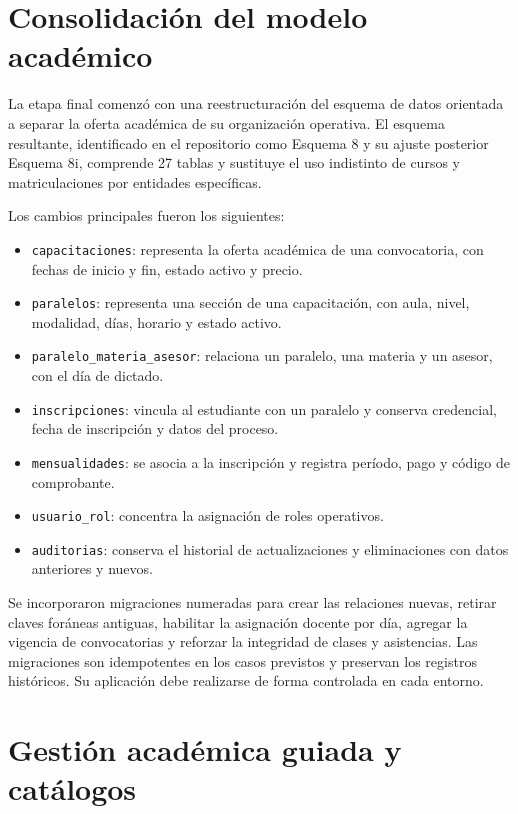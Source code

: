 \documentclass[12pt,a4paper,oneside]{report}
\begin{document}
\section{Consolidación del modelo académico}

La etapa final comenzó con una reestructuración del esquema de datos orientada a separar la oferta académica de su organización operativa. El esquema resultante, identificado en el repositorio como Esquema 8 y su ajuste posterior Esquema 8i, comprende 27 tablas y sustituye el uso indistinto de cursos y matriculaciones por entidades específicas.

Los cambios principales fueron los siguientes:

\begin{itemize}[leftmargin=1.5em]
  \item \texttt{capacitaciones}: representa la oferta académica de una convocatoria, con fechas de inicio y fin, estado activo y precio.
  \item \texttt{paralelos}: representa una sección de una capacitación, con aula, nivel, modalidad, días, horario y estado activo.
  \item \texttt{paralelo\_materia\_asesor}: relaciona un paralelo, una materia y un asesor, con el día de dictado.
  \item \texttt{inscripciones}: vincula al estudiante con un paralelo y conserva credencial, fecha de inscripción y datos del proceso.
  \item \texttt{mensualidades}: se asocia a la inscripción y registra período, pago y código de comprobante.
  \item \texttt{usuario\_rol}: concentra la asignación de roles operativos.
  \item \texttt{auditorias}: conserva el historial de actualizaciones y eliminaciones con datos anteriores y nuevos.
\end{itemize}

Se incorporaron migraciones numeradas para crear las relaciones nuevas, retirar claves foráneas antiguas, habilitar la asignación docente por día, agregar la vigencia de convocatorias y reforzar la integridad de clases y asistencias. Las migraciones son idempotentes en los casos previstos y preservan los registros históricos. Su aplicación debe realizarse de forma controlada en cada entorno.

\section{Gestión académica guiada y catálogos}
\end{document}
